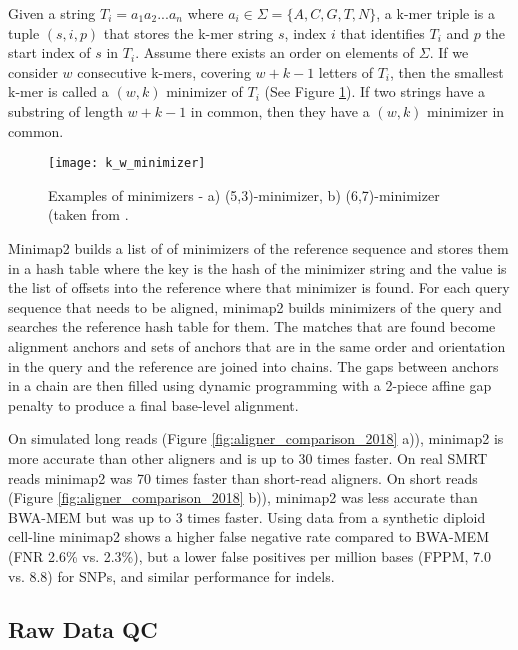 Given a string $T_i=a_1a_2...a_n$ where $a_i \in \Sigma = \{A,C,G,T,N\}$, a k-mer triple is a tuple $(s,i,p)$ that stores the k-mer string $s$, index $i$ that identifies $T_i$ and $p$ the start index of $s$ in $T_i$. Assume there exists an order on elements of $\Sigma$. If we consider $w$ consecutive k-mers, covering $w+k-1$ letters of $T_i$, then the smallest k-mer is called a $(w,k)$ minimizer of $T_i$ (See Figure \ref{fig:k_w_minimizer}). If two strings have a substring of length $w+k-1$ in common, then they have a $(w,k)$ minimizer in common.

\begin{figure}[h!]
    \texttt{[image: k\_w\_minimizer]}
    \caption {Examples of minimizers - a) (5,3)-minimizer, b) (6,7)-minimizer (taken from \autocite{roberts2004reducing}.}
    \label{fig:k_w_minimizer}
\end{figure}

Minimap2 builds a list of of minimizers of the reference sequence and stores them in a hash table where the key is the hash of the minimizer string and the value is the list of offsets into the reference where that minimizer is found. For each query sequence that needs to be aligned, minimap2 builds minimizers of the query and searches the reference hash table for them. The matches that are found become alignment anchors and sets of anchors that are in the same order and orientation in the query and the reference are joined into chains. The gaps between anchors in a chain are then filled using dynamic programming with a 2-piece affine gap penalty to produce a final base-level alignment.

On simulated long reads (Figure \ref{fig:aligner_comparison_2018} a)), minimap2 is more accurate than other aligners and is up to 30 times faster. On real SMRT reads minimap2 was 70 times faster than short-read aligners. On short reads (Figure \ref{fig:aligner_comparison_2018} b)), minimap2 was less accurate than BWA-MEM but was up to 3 times faster. Using data from a synthetic diploid cell-line\autocite{li2018synthetic} minimap2 shows a higher false negative rate compared to BWA-MEM (FNR 2.6\% vs. 2.3\%), but a lower false positives per million bases (FPPM, 7.0 vs. 8.8) for SNPs, and similar performance for indels.

\subsection{Raw Data QC} 
\label{sec:bg_raw_data_qc}

